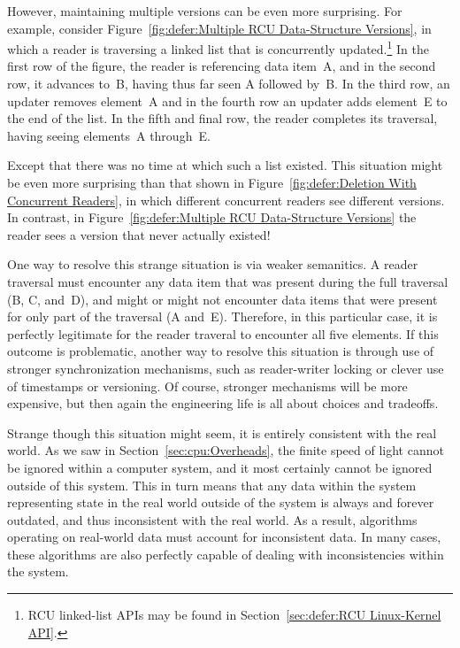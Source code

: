 However, maintaining multiple versions can be even more surprising.
For example, consider
Figure~\ref{fig:defer:Multiple RCU Data-Structure Versions},
in which a reader is traversing a linked list that is concurrently
updated.\footnote{
	RCU linked-list APIs may be found in
	Section~\ref{sec:defer:RCU Linux-Kernel API}.}
In the first row of the figure, the reader is referencing data item~A,
and in the second row, it advances to~B, having thus far seen A followed by~B\@.
In the third row, an updater removes element~A and in the fourth row
an updater adds element~E to the end of the list.
In the fifth and final row, the reader completes its traversal, having
seeing elements~A through~E\@.

Except that there was no time at which such a list existed.
This situation might be even more surprising than that shown in
Figure~\ref{fig:defer:Deletion With Concurrent Readers},
in which different concurrent readers see different versions.
In contrast, in
Figure~\ref{fig:defer:Multiple RCU Data-Structure Versions}
the reader sees a version that never actually existed!

One way to resolve this strange situation is via weaker semanitics.
A reader traversal must encounter any data item that was present
during the full traversal (B, C, and~D), and might or might not
encounter data items that were present for only part of the
traversal (A and~E).
Therefore, in this particular case, it is perfectly legitimate for
the reader traveral to encounter all five elements.
If this outcome is problematic, another way to resolve this situation is
through use of stronger synchronization mechanisms, such as reader-writer
locking or clever use of timestamps or versioning.
Of course, stronger mechanisms will be more expensive, but then again
the engineering life is all about choices and tradeoffs.

Strange though this situation might seem, it is entirely consistent with
the real world.
As we saw in
Section~\ref{sec:cpu:Overheads},
the finite speed of light cannot be ignored within a computer system,
and it most certainly cannot be ignored outside of this system.
This in turn means that any data within the system representing state
in the real world outside of the system is always and forever outdated,
and thus inconsistent with the real world.
As a result, algorithms operating on real-world data must account for
inconsistent data.
In many cases, these algorithms are also perfectly capable of dealing
with inconsistencies within the system.


